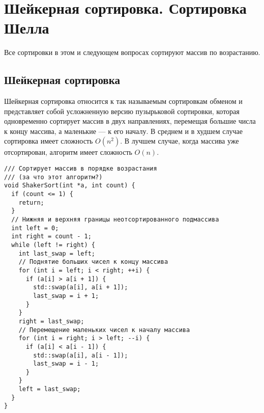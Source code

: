 \newcommand{\asgn}{\gets\,}
\newenvironment{landscape}{%
\newgeometry{textwidth=\textheight,textheight=\textwidth,left=15mm,top=15mm}%
\eject\pagewidth=297mm\pageheight=210mm%
}{%
\restoregeometry%
\eject\pagewidth=210mm\pageheight=297mm%
}

\section{Шейкерная сортировка. Сортировка Шелла}
Все сортировки в этом и следующем вопросах сортируют массив по возрастанию.
\subsection{Шейкерная сортировка}
Шейкерная сортировка относится к так называемым сортировкам обменом и представляет
собой усложненную версию пузырьковой сортировки, которая одновременно сортирует массив
в двух направлениях, перемещая большие числа к концу массива, а маленькие --- к его началу.
В среднем и в худшем случае сортировка имеет сложность $O(n^2)$. В лучшем случае, когда
массива уже отсортирован, алгоритм имеет сложность $O(n)$.

\begin{verbatim}
/// Сортирует массив в порядке возрастания
/// (за что этот алгоритм?)
void ShakerSort(int *a, int count) {
  if (count <= 1) {
    return;
  }
  // Нижняя и верхняя границы неотсортированного подмассива
  int left = 0;
  int right = count - 1;
  while (left != right) {
    int last_swap = left;
    // Поднятие больших чисел к концу массива
    for (int i = left; i < right; ++i) {
      if (a[i] > a[i + 1]) {
        std::swap(a[i], a[i + 1]);
        last_swap = i + 1;
      }
    }
    right = last_swap;
    // Перемещение маленьких чисел к началу массива
    for (int i = right; i > left; --i) {
      if (a[i] < a[i - 1]) {
        std::swap(a[i], a[i - 1]);
        last_swap = i - 1;
      }
    }
    left = last_swap;
  }
}  
\end{verbatim}

